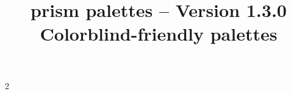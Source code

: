 \documentclass[theme = dark]{tutodoc}
\title{\raisebox{-.20ex}{@}prism palettes -- Version 1.3.0\\ Colorblind-friendly palettes}
\date{}
\begin{document}
\maketitle{}

{
  \setlength{\columnsep}{2cm}
  \setlength{\columnseprule}{0.4pt}

  \begin{multicols}{2}
    \tableofcontents
  \end{multicols}
}

\newpage


















\end{document}
